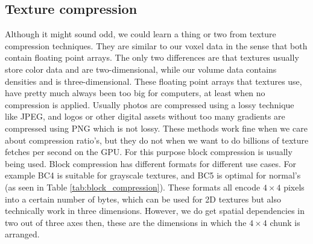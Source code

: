 \clearpage\subsection{Texture compression} \label{related_work:texture_compression}
Although it might sound odd, we could learn a thing or two from texture compression techniques. They are similar to our voxel data in the sense that both contain floating point arrays. The only two differences are that textures usually store color data and are two-dimensional, while our volume data contains densities and is three-dimensional. These floating point arrays that textures use, have pretty much always been too big for computers, at least when no compression is applied. Usually photos are compressed using a lossy technique like JPEG, and logos or other digital assets without too many gradients are compressed using PNG which is not lossy. These methods work fine when we care about compression ratio's, but they do not when we want to do billions of texture fetches per second on the GPU. For this purpose block compression is usually being used\cite{BlockCompression}. Block compression has different formats for different use cases. For example BC4 is suitable for grayscale textures, and BC5 is optimal for normal's (as seen in Table \ref{tab:block_compression}). These formats all encode $4\times 4$ pixels into a certain number of bytes, which can be used for 2D textures but also technically work in three dimensions. However, we do get spatial dependencies in two out of three axes then, these are the dimensions in which the $4\times 4$ chunk is arranged.

